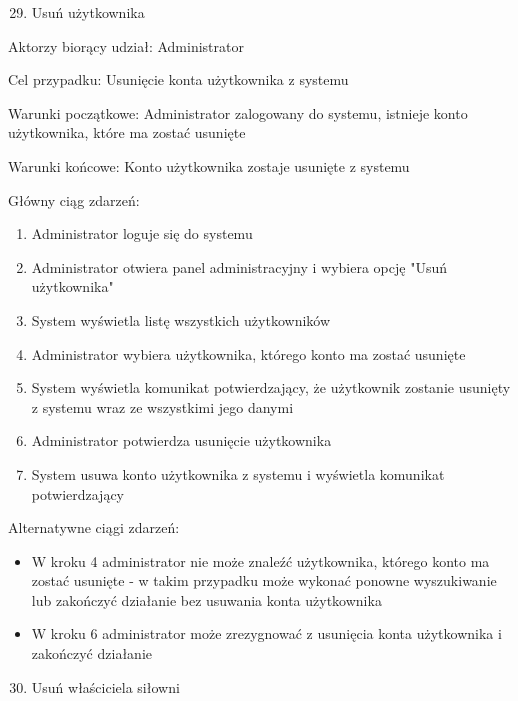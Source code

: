\documentclass[
]{article}
\providecommand{\tightlist}{%
  \setlength{\itemsep}{0pt}\setlength{\parskip}{0pt}}
\begin{document}
\begin{enumerate}
\setcounter{enumi}{28}
\tightlist
\item
  {Usuń użytkownika}
\end{enumerate}

{Aktorzy biorący udział: Administrator}

{Cel przypadku: Usunięcie konta użytkownika z systemu}

{Warunki początkowe: Administrator zalogowany do systemu, istnieje konto
użytkownika, które ma zostać usunięte}

{Warunki końcowe: Konto użytkownika zostaje usunięte z systemu}

{Główny ciąg zdarzeń:}

\begin{enumerate}
\tightlist
\item
  {Administrator loguje się do systemu}
\item
  {Administrator otwiera panel administracyjny i wybiera opcję "Usuń
  użytkownika"}
\item
  {System wyświetla listę wszystkich użytkowników}
\item
  {Administrator wybiera użytkownika, którego konto ma zostać usunięte}
\item
  {System wyświetla komunikat potwierdzający, że użytkownik zostanie
  usunięty z systemu wraz ze wszystkimi jego danymi}
\item
  {Administrator potwierdza usunięcie użytkownika}
\item
  {System usuwa konto użytkownika z systemu i wyświetla komunikat
  potwierdzający}
\end{enumerate}

{Alternatywne ciągi zdarzeń:}

\begin{itemize}
\tightlist
\item
  {W kroku 4 administrator nie może znaleźć użytkownika, którego konto
  ma zostać usunięte - w takim przypadku może wykonać ponowne
  wyszukiwanie lub zakończyć działanie bez usuwania konta użytkownika}
\item
  {W kroku 6 administrator może zrezygnować z usunięcia konta
  użytkownika i zakończyć działanie}
\end{itemize}

{}

{}

{}

\begin{enumerate}
\setcounter{enumi}{29}
\tightlist
\item
  {Usuń właściciela siłowni}
\end{enumerate}
\end{document}
